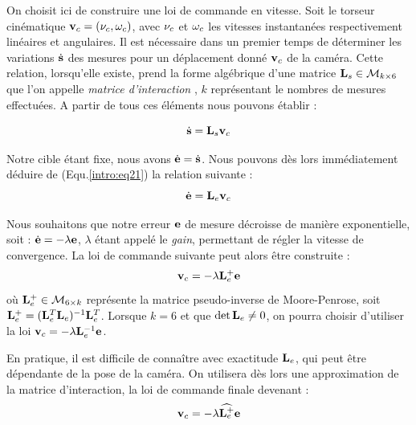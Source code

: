 On choisit ici de construire une loi de commande en vitesse. Soit le torseur 
cinématique ${\bf v}_c = ({\bf \nu}_c, {\bf \omega}_c)$, avec ${\bf \nu}_c$ et 
${\bf \omega}_c$ les vitesses instantanées respectivement linéaires et 
angulaires. Il est nécessaire dans un premier temps de déterminer les 
variations $\dot {\bf s}$ des mesures pour un déplacement donné ${\bf v}_c$ de 
la caméra. Cette relation, lorsqu'elle existe, prend la forme algébrique d'une 
matrice ${\bf L}_s \in \mathcal M_{k\times 6}$ que l'on appelle {\it matrice 
d'interaction} \cite{espiau1992}, $k$ représentant le nombres de mesures 
effectuées. A partir de tous ces éléments nous pouvons établir :

\begin{equation}
\dot {\bf s} = {\bf L}_s {\bf v}_c
\label{intro:eq21}
\end{equation}

Notre cible étant fixe, nous avons $\dot {\bf e} = \dot {\bf s}$. Nous pouvons 
dès lors immédiatement déduire de (Equ.\ref{intro:eq21}) la relation suivante :
\begin{equation}
\dot {\bf e} = {\bf L}_e {\bf v}_c
\label{intro:eq22}
\end{equation}

Nous souhaitons que notre erreur ${\bf e}$ de mesure décroisse de manière 
exponentielle, soit : $\dot {\bf e} = - \lambda {\bf e}$, $\lambda$ étant appelé 
le {\it gain}, permettant de régler la vitesse de convergence. La loi de 
commande suivante peut alors être construite :
\begin{equation}
{\bf v}_c = - \lambda {\bf L}_e^+ {\bf e} 
\label{intro:eq23}
\end{equation}
où ${\bf L}_e^+ \in \mathcal M_{6 \times k}$ représente la matrice 
pseudo-inverse de Moore-Penrose, soit ${\bf L}_e^+ = ({\bf L}_e^T {\bf 
L}_e)^{-1} {\bf L}_e^T$. Lorsque $k = 6$ et que $\det {\bf L}_e \neq 0$, on 
pourra choisir d'utiliser la loi ${\bf v}_c = - \lambda {\bf L}_e^{-1} {\bf e} 
$.

En pratique, il est difficile de connaître avec exactitude ${\bf L}_e$, qui peut 
être dépendante de la pose de la caméra. On utilisera dès lors une approximation 
de la matrice d'interaction, la loi de commande finale devenant :
\begin{equation}
{\bf v}_c = - \lambda \widehat {{\bf L}_e^+} {\bf e} 
\label{intro:eq24}
\end{equation}

